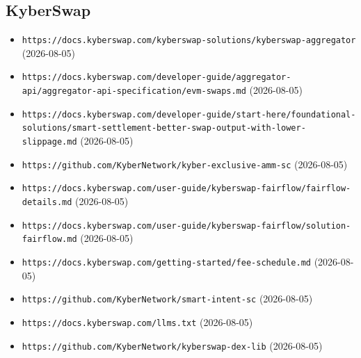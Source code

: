 \subsection*{KyberSwap}
\begin{itemize}\setlength{\itemsep}{0pt}\small
\item \texttt{https://docs.kyberswap.com/kyberswap-solutions/kyberswap-aggregator} (2026-08-05)
\item \texttt{https://docs.kyberswap.com/developer-guide/aggregator-api/aggregator-api-specification/evm-swaps.md} (2026-08-05)
\item \texttt{https://docs.kyberswap.com/developer-guide/start-here/foundational-solutions/smart-settlement-better-swap-output-with-lower-slippage.md} (2026-08-05)
\item \texttt{https://github.com/KyberNetwork/kyber-exclusive-amm-sc} (2026-08-05)
\item \texttt{https://docs.kyberswap.com/user-guide/kyberswap-fairflow/fairflow-details.md} (2026-08-05)
\item \texttt{https://docs.kyberswap.com/user-guide/kyberswap-fairflow/solution-fairflow.md} (2026-08-05)
\item \texttt{https://docs.kyberswap.com/getting-started/fee-schedule.md} (2026-08-05)
\item \texttt{https://github.com/KyberNetwork/smart-intent-sc} (2026-08-05)
\item \texttt{https://docs.kyberswap.com/llms.txt} (2026-08-05)
\item \texttt{https://github.com/KyberNetwork/kyberswap-dex-lib} (2026-08-05)
\end{itemize}


